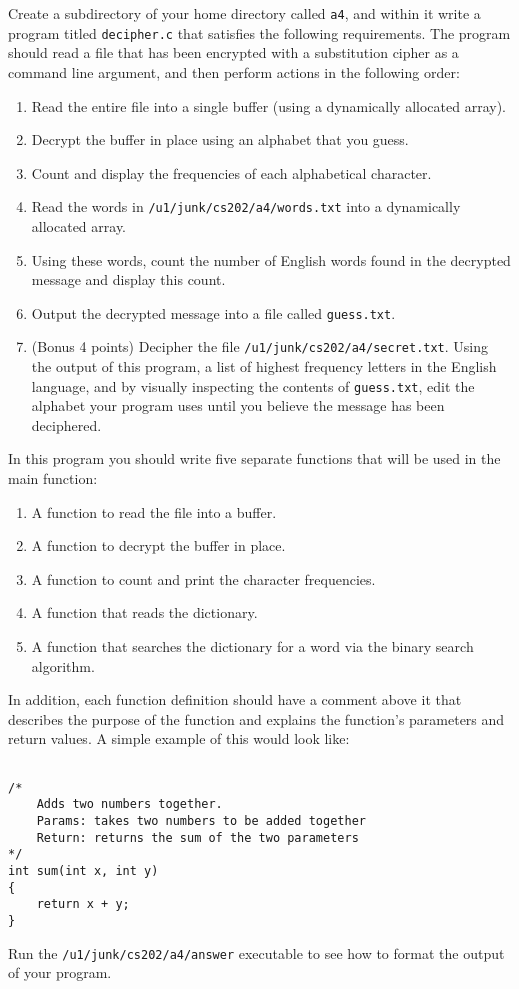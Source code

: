 \documentclass[12pt]{article}
\begin{document}
\noindent
Create a subdirectory of your home directory called \texttt{a4}, and within it
write a program titled \texttt{decipher.c} that satisfies the following
requirements. The program should read a file that has been encrypted with a
substitution cipher as a command line argument, and then perform actions in the
following order:

\begin{enumerate}
  \item Read the entire file into a single buffer (using a dynamically
    allocated array).
  \item Decrypt the buffer in place using an alphabet that you guess.
  \item Count and display the frequencies of each alphabetical character.
  \item Read the words in \texttt{/u1/junk/cs202/a4/words.txt} into a dynamically
    allocated array.
  \item Using these words, count the number of English words found in the
    decrypted message and display this count.
  \item Output the decrypted message into a file called \texttt{guess.txt}.
  \item (Bonus 4 points) Decipher the file \texttt{/u1/junk/cs202/a4/secret.txt}. Using 
    the output of this program, a list of highest
    frequency letters in the English language, and by visually inspecting the
    contents of \texttt{guess.txt}, edit the alphabet your program uses until
    you believe the message has been deciphered.
\end{enumerate}

\noindent
In this program you should write five separate functions that will be used in
the main function:

\begin{enumerate}
  \item A function to read the file into a buffer.
  \item A function to decrypt the buffer in place.
  \item A function to count and print the character frequencies.
  \item A function that reads the dictionary.
  \item A function that searches the dictionary for a word via the binary
    search algorithm.
\end{enumerate}

\noindent
In addition, each function definition should have a comment above it that
describes the purpose of the function and explains the function's parameters and
return values. A simple example of this would look like:

\begin{verbatim}

/*
    Adds two numbers together.
    Params: takes two numbers to be added together
    Return: returns the sum of the two parameters
*/
int sum(int x, int y)
{
    return x + y;
}

\end{verbatim}

\noindent
Run the \texttt{/u1/junk/cs202/a4/answer} executable to see how to format the
output of your program.
\end{document}

